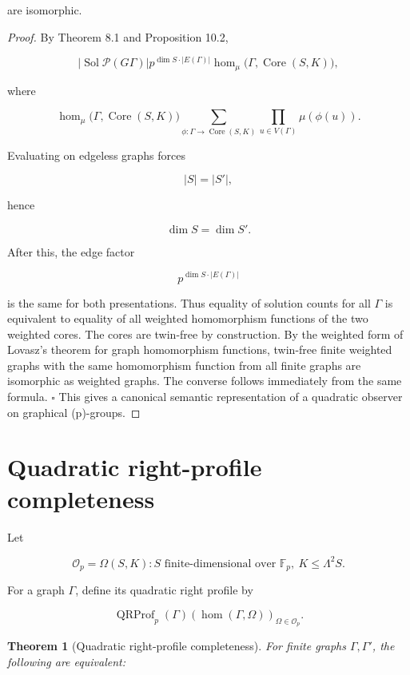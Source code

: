 \documentclass[11pt]{article}
\newtheorem{theorem}{Theorem}[section]
\begin{document}
are isomorphic.

\begin{proof}
By Theorem 8.1 and Proposition 10.2,

\[
|\operatorname{Sol}
{\mathcal P}(G
\Gamma)|
p^{\dim S\cdot |E(\Gamma)|}
\operatorname{hom}_{\mu}
\bigl(\Gamma,\operatorname{Core}(S,K)\bigr),
\]

where

\[
\operatorname{hom}_{\mu}
\bigl(\Gamma,\operatorname{Core}(S,K)\bigr)
\sum_{\phi:\Gamma\to\operatorname{Core}(S,K)}
\prod_{u\in V(\Gamma)}\mu(\phi(u)).
\]

Evaluating on edgeless graphs forces

\[
|S|=|S'|,
\]

hence

\[
\dim S=\dim S'.
\]

After this, the edge factor

\[
p^{\dim S\cdot |E(\Gamma)|}
\]

is the same for both presentations. Thus equality of solution counts for all $\Gamma$ is equivalent to equality of all weighted homomorphism functions of the two weighted cores. The cores are twin-free by construction. By the weighted form of Lovasz's theorem for graph homomorphism functions, twin-free finite weighted graphs with the same homomorphism function from all finite graphs are isomorphic as weighted graphs. The converse follows immediately from the same formula. $\square$ This gives a canonical semantic representation of a quadratic observer on graphical (p)-groups.

\end{proof}

\section{Quadratic right-profile completeness}

Let

\[
\mathcal O_p=
{\Omega(S,K):S\text{ finite-dimensional over }\mathbb F_p,\ K\le\Lambda^2S}.
\]

For a graph $\Gamma$, define its quadratic right profile by

\[
\operatorname{QRProf}_p(\Gamma)
\left(
\operatorname{hom}(\Gamma,\Omega)
\right)_{\Omega\in\mathcal O_p}.
\]

\begin{theorem}[Quadratic right-profile completeness]
For finite graphs $\Gamma,\Gamma'$, the following are equivalent:

\end{theorem}
\end{document}
